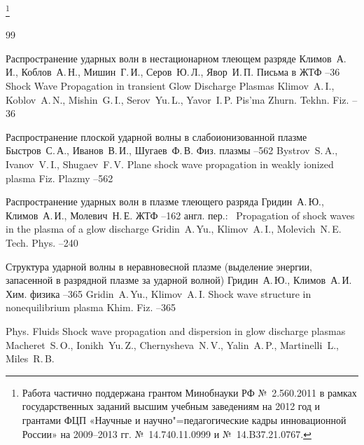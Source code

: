 \thanks{Работа частично поддержана­­ грантом Минобнауки­­ РФ №~2.560.2011 в рамках государственных заданий высшим учебным заведениям­­ на 2012 год и грантами ФЦП «Научные и научно"=педагогиче­­ские кадры инновацион­­ной России» на 2009--2013 гг. №~14.740.11.0999 и №~14.B37.21.0767.}

\pagebreak

\begin{thebibliography}{99}


\paper Распространение ударных волн в нестационарном тлеющем разряде 
\by  Климов~А.\,И., Коблов~А.\,Н., Мишин~Г.\,И., Серов~Ю.\,Л., Явор~И.\,П.
\jour Письма в ЖТФ 
--36
\misctransl
\paper Shock Wave Propagation in transient  Glow Discharge Plasmas
\by  Klimov~A.\,I., Koblov~A.\,N., Mishin~G.\,I., Serov~Yu.\,L., Yavor~I.\,P.
\jour Pis'ma Zhurn. Tekhn. Fiz.
--36

\paper Распространение плоской ударной волны в слабоионизованной плазме 
\by   Быстров~С.\,А.,  Иванов~В.\,И., Шугаев~Ф.\,В. 
\jour Физ. плазмы 
--562
\misctransl
\by Bystrov~S.\,A., Ivanov~V.\,I., Shugaev~F.\,V.
\paper  Plane shock wave propagation in weakly ionized plasma 
\jour Fiz. Plazmy
--562

\paper Распространение ударных волн в плазме тлеющего разряда 
\by    Гридин~А.\,Ю.,  Климов~А.\,И., Молевич~Н.\,Е. 
\jour ЖТФ 
--162
\transl англ. пер.:~
\paper Propagation of shock waves in the plasma of a glow discharge
\by Gridin~A.\,Yu., Klimov~A.\,I., Molevich~N.\,E.
\jour Tech. Phys.
--240

\paper Структура ударной волны в неравновесной плазме (выделение энергии, запасенной в разрядной плазме за ударной волной) 
\by   Гридин~А.\,Ю.,  Климов~А.\,И. 
\jour Хим.  физика 
--365
\misctransl
\by Gridin~A.\,Yu., Klimov~A.\,I. 
\paper Shock wave structure in nonequilibrium plasma 
\jour Khim. Fiz.
–365


\jour Phys. Fluids
\paper Shock wave propagation and dispersion in glow discharge plasmas
\by  Macheret~S.\,O.,  Ionikh~Yu.\,Z., Chernysheva~N.\,V.,  Yalin~A.\,P.,  Martinelli~L.,  Miles~R.\,B. 



\end{thebibliography}
